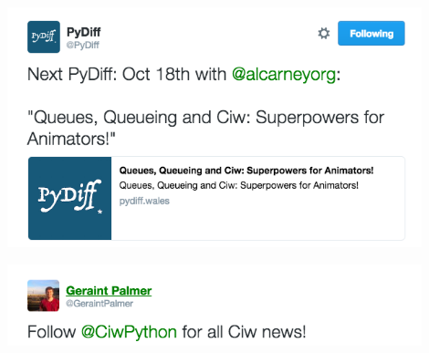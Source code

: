 \documentclass{beamer}
\begin{document}
\begin{frame}
  \begin{center}
  \href{https://twitter.com/PyDiff/status/780692987038818304}{\includegraphics[width=0.9\textwidth]{tweets/animation_pydiff}}
  \end{center}
\end{frame}

\begin{frame}
  \begin{center}
  \href{https://twitter.com/GeraintPalmer/status/747477836060049408}{\includegraphics[width=0.9\textwidth]{tweets/follow_ciw}}
  \end{center}
\end{frame}
\end{document}
